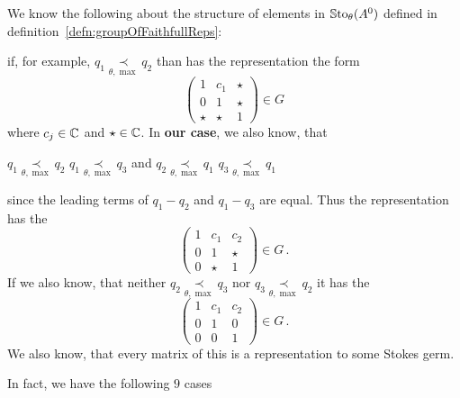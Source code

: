 We know the following about the structure of elements in $\operatorname{\mathbb{S}to}_\theta(A^0)$
defined in definition~\ref{defn:groupOfFaithfullReps}:
\begin{einr}
  if, for example, $q_1 \underset{\theta,\max}{\prec} q_2$ than has the
  representation the form
  \[
    \begin{pmatrix}
      1 & c_1 & \star
    \\0 & 1 & \star
    \\\star & \star & 1
    \end{pmatrix}\in G
  \]
  where $c_j\in\mathbb{C}$ and $\star\in\mathbb{C}$.
  In \textbf{our case}, we also know, that
  \begin{einr}
    $q_1 \underset{\theta,\max}{\prec} q_2$
    \Leftrightarrow{}
    $q_1 \underset{\theta,\max}{\prec} q_3$
    \qquad and \qquad
    $q_2 \underset{\theta,\max}{\prec} q_1$
    \Leftrightarrow{}
    $q_3 \underset{\theta,\max}{\prec} q_1$
  \end{einr}
  since the leading terms of $q_1-q_2$ and $q_1-q_3$ are equal. Thus the
  representation has the 
  \[
    \begin{pmatrix}
      1 & c_1 & c_2
    \\0 & 1 & \star
    \\0 & \star & 1
    \end{pmatrix}\in G\,.
  \]
  If we also know, that neither $q_2 \underset{\theta,\max}{\prec} q_3$ nor
  $q_3 \underset{\theta,\max}{\prec} q_2$ it has the 
  \[
    \begin{pmatrix}
      1 & c_1 & c_2
    \\0 & 1 & 0
    \\0 & 0 & 1
    \end{pmatrix}\in G\,.
  \]
  We also know, that every matrix of this  is a representation to
  some Stokes germ.
\end{einr}
In fact, we have the following $9$ cases

